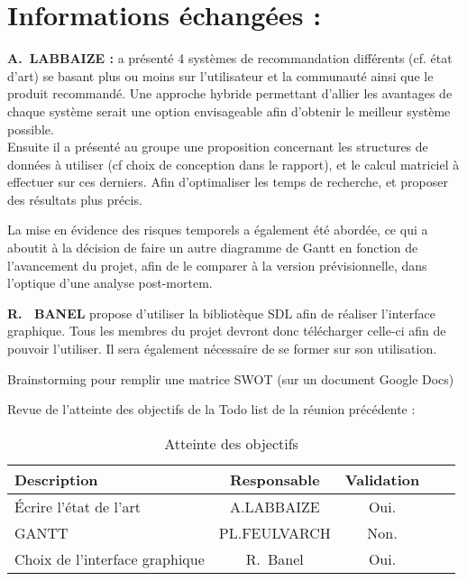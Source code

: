 \documentclass[11pt]{meetingmins}
\begin{document}
\section{Informations échangées :}
\begin{hiddenitems}
\item
\textbf{A.~LABBAIZE : } a présenté 4 systèmes de recommandation différents (cf. état d'art) se basant plus ou moins sur l'utilisateur et la communauté ainsi que le produit recommandé. Une approche hybride permettant d'allier les avantages de chaque système serait une option envisageable afin d'obtenir le meilleur système possible. \\
Ensuite il a présenté au groupe une proposition concernant les structures de données à utiliser (cf choix de conception dans le rapport), et le calcul matriciel à effectuer sur ces derniers. Afin d'optimaliser les temps de recherche, et proposer des résultats plus précis.
\item
La mise en évidence des risques temporels a également été abordée, ce qui a aboutit à la décision de faire un autre diagramme de Gantt en fonction de l'avancement du projet, afin de le comparer à la version prévisionnelle, dans l'optique d'une analyse post-mortem.
\item
\textbf{R. ~BANEL} propose d'utiliser la bibliotèque SDL afin de réaliser l'interface graphique. Tous les membres du projet devront donc télécharger celle-ci afin de pouvoir l'utiliser. Il sera également nécessaire de se former sur son utilisation.
\item
Brainstorming pour remplir une matrice SWOT (sur un document Google Docs)

\item Revue de l'atteinte des objectifs de la Todo list de la réunion précédente :
\begin{table}[h]
    \centering
    \begin{tabular}{|p{4cm}|c|c|c|c|}
    \hline
        \rowcolor{yellow} Description & Responsable & Validation
        \tabularnewline \hline
        Écrire l'état de l'art &  A.LABBAIZE & Oui.
        \tabularnewline \hline
        GANTT & PL.FEULVARCH & Non.
        \tabularnewline \hline
        Choix de l'interface graphique  & R.~Banel & Oui. \tabularnewline \hline 

        
    \end{tabular}
    \caption{Atteinte des objectifs}
    \label{tab:my_label}
\end{table}

\end{hiddenitems}
\end{document}
